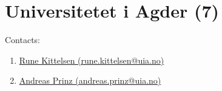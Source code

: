 \section{Universitetet i Agder (7)}
\label{sec:UiA}

Contacts:\begin{enumerate}
 \item {}\href{mailto:rune.kittelsen@uia.no}{Rune Kittelsen (rune.kittelsen@uia.no)}
 \item {}\href{mailto:andreas.prinz@uia.no}{Andreas Prinz (andreas.prinz@uia.no)}
\end{enumerate}

